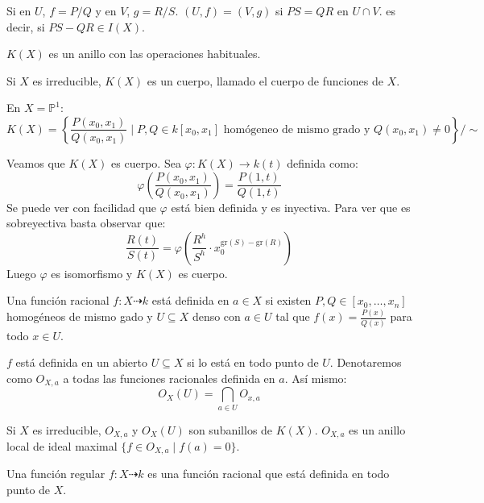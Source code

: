 \documentclass[ACGA.tex]{subfiles}
\begin{document}
\begin{nota}
Si en $U$, $f=P/Q$ y en $V$, $g=R/S$. $(U,f)=(V,g)$ si  $PS=QR$ en $U \cap V$. es decir, si $PS-QR\in I(X)$.
\end{nota}

\begin{prop}
$K(X)$ es un anillo con las operaciones habituales.
\end{prop}

\begin{prop}
Si $X$ es irreducible, $K(X)$ es un cuerpo, llamado el cuerpo de funciones de $X$.
\end{prop}

\begin{ej}
En $X=\mathbb{P}^1$:
\[ K(X) = \left\{\frac{P(x_0,x_1)}{Q(x_0,x_1)} \mid P,Q \in k[x_0,x_1] \text{ homógeneo de mismo grado y }Q(x_0,x_1)\neq 0\right\} / \sim \]

Veamos que $K(X)$ es cuerpo. Sea $φ : K(X) \to k(t)$ definida como:
\[ φ\left(\frac{P(x_0,x_1)}{Q(x_0,x_1)}\right)  = \frac{P(1,t)}{Q(1,t)} \]
Se puede ver con facilidad que $φ$ está bien definida y es inyectiva. Para ver que es sobreyectiva basta observar que:
\[ \frac{R(t)}{S(t)} = φ \left(\frac{R^h}{S^h} \cdot x_0^{\text{gr}(S)-\text{gr}(R)} \right)\]
Luego $φ$ es isomorfismo y $K(X)$ es cuerpo.
\end{ej}

\begin{defi}
Una función racional $f : X \dashrightarrow k$ está definida en $a \in X$ si existen $P,Q \in [x_0,\dots,x_n]$ homogéneos de mismo gado y $U \subseteq X$ denso con $a \in U$ tal que $f(x) = \frac{P(x)}{Q(x)}$ para todo $x \in U$.
\end{defi}

\begin{defi}
$f$ está definida en un abierto $U \subseteq X$ si lo está en todo punto de $U$. Denotaremos como $O_{X,a}$ a todas las funciones racionales definida en $a$. Así mismo:
\[ O_X(U) = \bigcap_{a \in U} O_{x,a} \]
\end{defi}

\begin{prop}
Si $X$ es irreducible, $O_{X,a}$ y $O_X(U)$ son subanillos de $K(X)$. $O_{X,a}$ es un anillo local de ideal maximal $\{f \in O_{X,a} \mid f(a)=0\}$.
\end{prop}

\begin{defi}
Una función regular $f : X \dashrightarrow k$ es una función racional que está definida en todo punto de $X$.
\end{defi}
\end{document}

